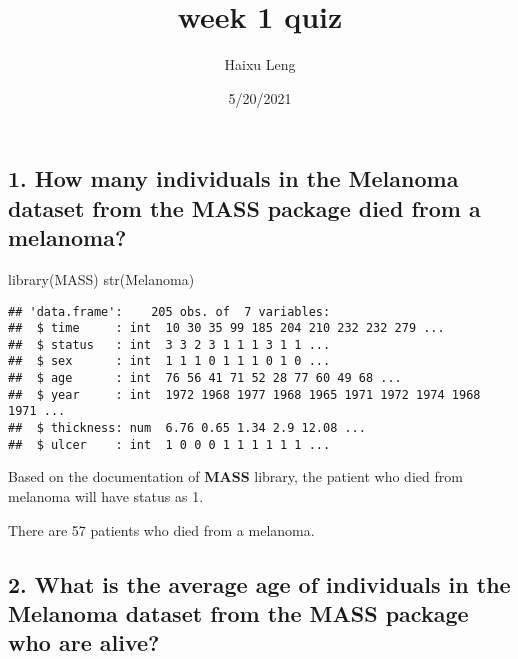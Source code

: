 \documentclass[
]{article}
\title{week 1 quiz}
\author{Haixu Leng}
\date{5/20/2021}
\newenvironment{Shaded}{\begin{snugshade}}{\end{snugshade}}
\newcommand{\DecValTok}[1]{\textcolor[rgb]{0.00,0.00,0.81}{#1}}
\newcommand{\FunctionTok}[1]{\textcolor[rgb]{0.00,0.00,0.00}{#1}}
\newcommand{\NormalTok}[1]{#1}
\newcommand{\OtherTok}[1]{\textcolor[rgb]{0.56,0.35,0.01}{#1}}
\newcommand{\SpecialCharTok}[1]{\textcolor[rgb]{0.00,0.00,0.00}{#1}}
\begin{document}
\maketitle

\hypertarget{how-many-individuals-in-the-melanoma-dataset-from-the-mass-package-died-from-a-melanoma}{%
\subsection{1. How many individuals in the Melanoma dataset from the
MASS package died from a
melanoma?}\label{how-many-individuals-in-the-melanoma-dataset-from-the-mass-package-died-from-a-melanoma}}

\begin{Shaded}
\begin{Highlighting}[]
\FunctionTok{library}\NormalTok{(MASS)}
\FunctionTok{str}\NormalTok{(Melanoma)}
\end{Highlighting}
\end{Shaded}

\begin{verbatim}
## 'data.frame':    205 obs. of  7 variables:
##  $ time     : int  10 30 35 99 185 204 210 232 232 279 ...
##  $ status   : int  3 3 2 3 1 1 1 3 1 1 ...
##  $ sex      : int  1 1 1 0 1 1 1 0 1 0 ...
##  $ age      : int  76 56 41 71 52 28 77 60 49 68 ...
##  $ year     : int  1972 1968 1977 1968 1965 1971 1972 1974 1968 1971 ...
##  $ thickness: num  6.76 0.65 1.34 2.9 12.08 ...
##  $ ulcer    : int  1 0 0 0 1 1 1 1 1 1 ...
\end{verbatim}

Based on the documentation of \textbf{MASS} library, the patient who
died from melanoma will have status as 1.

\begin{Shaded}
\end{Shaded}

There are 57 patients who died from a melanoma.

\hypertarget{what-is-the-average-age-of-individuals-in-the-melanoma-dataset-from-the-mass-package-who-are-alive}{%
\subsection{2. What is the average age of individuals in the Melanoma
dataset from the MASS package who are
alive?}\label{what-is-the-average-age-of-individuals-in-the-melanoma-dataset-from-the-mass-package-who-are-alive}}
\end{document}
